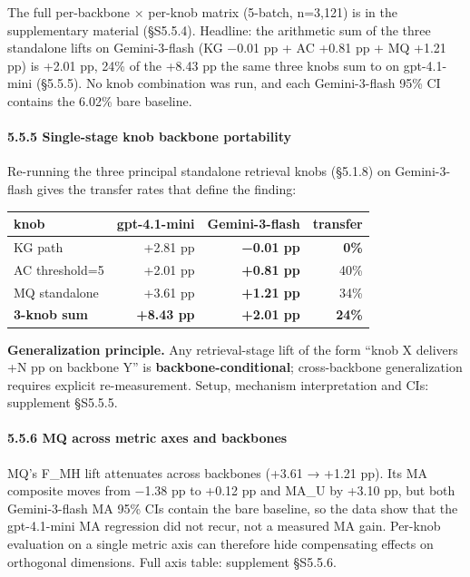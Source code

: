 \documentclass[
]{article}
\newcounter{none} %
\begin{document}
The full per-backbone × per-knob matrix (5-batch, n=3,121) is in the
supplementary material (§S5.5.4). Headline: the arithmetic sum of the
three standalone lifts on Gemini-3-flash (KG −0.01 pp + AC +0.81 pp + MQ
+1.21 pp) is +2.01 pp, 24\% of the +8.43 pp the same three knobs sum to
on gpt-4.1-mini (§5.5.5). No knob combination was run, and each
Gemini-3-flash 95\% CI contains the 6.02\% bare baseline.

\paragraph{5.5.5 Single-stage knob backbone
portability}\label{single-stage-knob-backbone-portability}

Re-running the three principal standalone retrieval knobs (§5.1.8) on
Gemini-3-flash gives the transfer rates that define the finding:

{\def\LTcaptype{none} %
\begin{longtable}[]{@{}lrrr@{}}
\toprule\noalign{}
knob & gpt-4.1-mini & Gemini-3-flash & transfer \\
\midrule\noalign{}
\endhead
\bottomrule\noalign{}
\endlastfoot
KG path & +2.81 pp & \textbf{−0.01 pp} & \textbf{0\%} \\
AC threshold=5 & +2.01 pp & \textbf{+0.81 pp} & 40\% \\
MQ standalone & +3.61 pp & \textbf{+1.21 pp} & 34\% \\
\textbf{3-knob sum} & \textbf{+8.43 pp} & \textbf{+2.01 pp} &
\textbf{24\%} \\
\end{longtable}
}

\textbf{Generalization principle.} Any retrieval-stage lift of the form
``knob X delivers +N pp on backbone Y'' is
\textbf{backbone-conditional}; cross-backbone generalization requires
explicit re-measurement. Setup, mechanism interpretation and CIs:
supplement §S5.5.5.

\paragraph{5.5.6 MQ across metric axes and
backbones}\label{mq-across-metric-axes-and-backbones}

MQ's F\_MH lift attenuates across backbones (+3.61 → +1.21 pp). Its MA
composite moves from −1.38 pp to +0.12 pp and MA\_U by +3.10 pp, but
both Gemini-3-flash MA 95\% CIs contain the bare baseline, so the data
show that the gpt-4.1-mini MA regression did not recur, not a measured
MA gain. Per-knob evaluation on a single metric axis can therefore hide
compensating effects on orthogonal dimensions. Full axis table:
supplement §S5.5.6.
\end{document}
